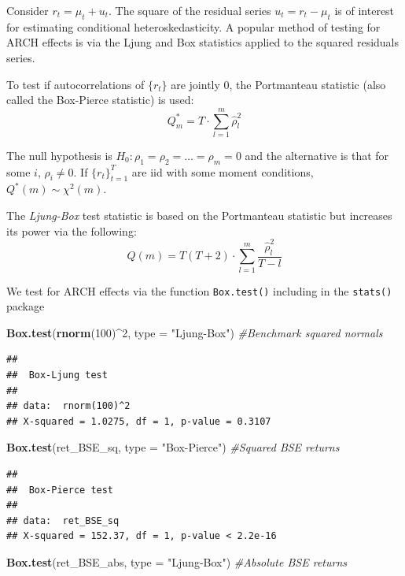\documentclass[11pt,]{article}
\newenvironment{Shaded}{\begin{snugshade}}{\end{snugshade}}
\newcommand{\KeywordTok}[1]{\textcolor[rgb]{0.13,0.29,0.53}{\textbf{#1}}}
\newcommand{\DataTypeTok}[1]{\textcolor[rgb]{0.13,0.29,0.53}{#1}}
\newcommand{\DecValTok}[1]{\textcolor[rgb]{0.00,0.00,0.81}{#1}}
\newcommand{\StringTok}[1]{\textcolor[rgb]{0.31,0.60,0.02}{#1}}
\newcommand{\CommentTok}[1]{\textcolor[rgb]{0.56,0.35,0.01}{\textit{#1}}}
\newcommand{\OperatorTok}[1]{\textcolor[rgb]{0.81,0.36,0.00}{\textbf{#1}}}
\newcommand{\NormalTok}[1]{#1}
\begin{document}
Consider \(r_t = \mu_t + u_t\). The square of the residual series
\(u_t = r_t - \mu_t\) is of interest for estimating conditional
heteroskedasticity. A popular method of testing for ARCH effects is via
the Ljung and Box statistics applied to the squared residuals series.

To test if autocorrelations of \(\{r_t\}\) are jointly 0, the
Portmanteau statistic (also called the Box-Pierce statistic) is used:
\[Q^*_m = T\cdot\sum_{l=1}^m \hat{\rho}^2_l\]

The null hypothesis is \(H_0:\rho_1=\rho_2=\hdots=\rho_m=0\) and the
alternative is that for some \(i\), \(\rho_i\neq 0\). If
\(\{r_t\}_{t=1}^T\) are iid with some moment conditions,
\(Q^*(m)\sim\chi^2(m)\).

The \emph{Ljung-Box} test statistic is based on the Portmanteau
statistic but increases its power via the following:
\[Q(m)=T(T+2)\cdot\sum_{l=1}^m \frac{\hat{\rho}_l^2}{T-l}\]

We test for ARCH effects via the function \texttt{Box.test()} including
in the \texttt{stats()} package

\begin{Shaded}
\begin{Highlighting}[]
\KeywordTok{Box.test}\NormalTok{(}\KeywordTok{rnorm}\NormalTok{(}\DecValTok{100}\NormalTok{)}\OperatorTok{^}\DecValTok{2}\NormalTok{, }\DataTypeTok{type =} \StringTok{"Ljung-Box"}\NormalTok{) }\CommentTok{#Benchmark squared normals}
\end{Highlighting}
\end{Shaded}

\begin{verbatim}
## 
##  Box-Ljung test
## 
## data:  rnorm(100)^2
## X-squared = 1.0275, df = 1, p-value = 0.3107
\end{verbatim}

\begin{Shaded}
\begin{Highlighting}[]
\KeywordTok{Box.test}\NormalTok{(ret_BSE_sq, }\DataTypeTok{type =} \StringTok{"Box-Pierce"}\NormalTok{) }\CommentTok{#Squared BSE returns}
\end{Highlighting}
\end{Shaded}

\begin{verbatim}
## 
##  Box-Pierce test
## 
## data:  ret_BSE_sq
## X-squared = 152.37, df = 1, p-value < 2.2e-16
\end{verbatim}

\begin{Shaded}
\begin{Highlighting}[]
\KeywordTok{Box.test}\NormalTok{(ret_BSE_abs, }\DataTypeTok{type =} \StringTok{"Ljung-Box"}\NormalTok{) }\CommentTok{#Absolute BSE returns}
\end{Highlighting}
\end{Shaded}
\end{document}

